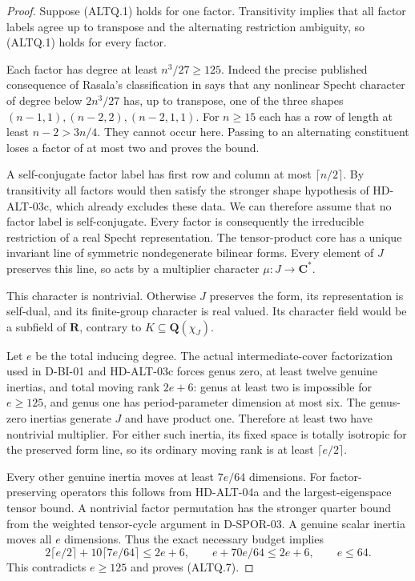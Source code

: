 \begin{proof}
Suppose (ALTQ.1) holds for one factor. Transitivity implies that
all factor labels agree up to transpose and the alternating
restriction ambiguity, so (ALTQ.1) holds for every factor.

Each factor has degree at least $n^3/27\ge125$.
Indeed the precise published consequence of Rasala's classification
in \cite[proof of Theorem~9.7, p.~312]{HD:GKT2019} says that any
nonlinear Specht character of degree below $2n^3/27$ has, up to
transpose, one of the three shapes $(n-1,1),(n-2,2),(n-2,1,1)$.
For $n\ge15$ each has a row of length at least $n-2>3n/4$.
They cannot occur here. Passing to an alternating constituent
loses a factor of at most two and proves the bound.

A self-conjugate factor label has first row and column at most
$\lceil n/2\rceil$. By transitivity all factors would then satisfy
the stronger shape hypothesis of HD-ALT-03c, which already
excludes these data. We can therefore assume that no factor
label is self-conjugate. Every factor is consequently the
irreducible restriction of a real Specht representation.
The tensor-product core has a unique invariant line of symmetric
nondegenerate bilinear forms. Every element of $J$ preserves
this line, so acts by a multiplier character
$\mu:J\longrightarrow\mathbf C^*$.

This character is nontrivial. Otherwise $J$ preserves the form,
its representation is self-dual, and its finite-group character
is real valued. Its character field would be a subfield of
$\mathbf R$, contrary to $K\subseteq\mathbf Q(\chi_J)$.

Let $e$ be the total inducing degree. The actual intermediate-cover
factorization used in D-BI-01 and HD-ALT-03c forces genus zero,
at least twelve genuine inertias, and total moving rank $2e+6$:
genus at least two is impossible for $e\ge125$, and genus one
has period-parameter dimension at most six. The genus-zero
inertias generate $J$ and have product one. Therefore at least
two have nontrivial multiplier. For either such inertia, its
fixed space is totally isotropic for the preserved form line,
so its ordinary moving rank is at least $\lceil e/2\rceil$.

Every other genuine inertia moves at least $7e/64$ dimensions.
For factor-preserving operators this follows from HD-ALT-04a
and the largest-eigenspace tensor bound. A nontrivial factor
permutation has the stronger quarter bound from the weighted
tensor-cycle argument in D-SPOR-03. A genuine scalar inertia
moves all $e$ dimensions. Thus the exact necessary budget implies
\[
 2\lceil e/2\rceil+10\lceil7e/64\rceil\le2e+6,
 \qquad e+70e/64\le2e+6,
 \qquad e\le64.
                                                               \tag{ALTQ.8}
\]
This contradicts $e\ge125$ and proves (ALTQ.7).
\end{proof}

